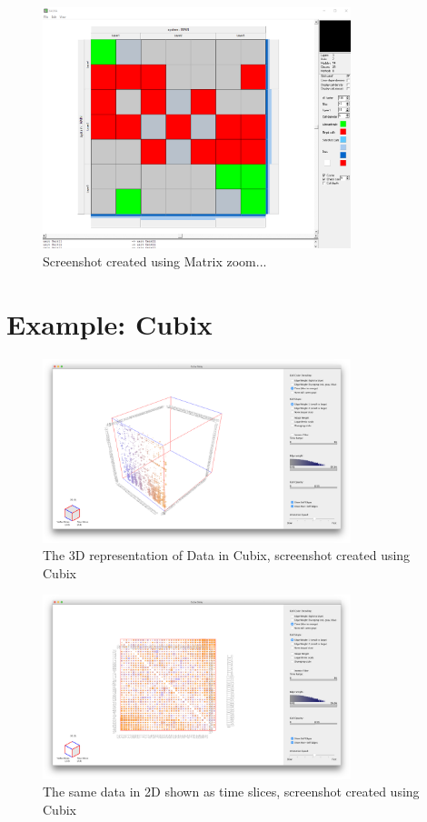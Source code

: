 \begin{figure}[H]
\centering
\includegraphics[width=0.8\textwidth]{images/matrixzoom_cell}
\caption{Screenshot created using Matrix zoom...\label{fig:zell_matrixzoom}}
\end{figure}


\section{Example: Cubix}

\begin{figure}[H]
\centering
\includegraphics[width=0.8\textwidth]{images/cubix3d_cell}
\caption{The 3D representation of Data in Cubix, screenshot created using Cubix\label{fig:cell_cubix3d}}
\end{figure}

\begin{figure}[H]
\centering
\includegraphics[width=0.8\textwidth]{images/cubix2d_cell}
\caption{The same data in 2D shown as time slices, screenshot created using Cubix\label{fig:cell_cubix2d}}
\end{figure}


